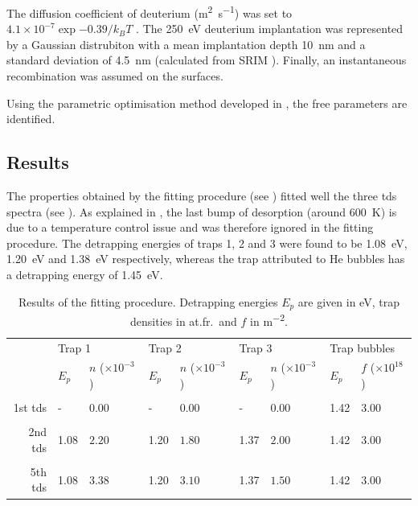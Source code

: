 The diffusion coefficient of deuterium (\si{m^2.s^{-1}}) was set to $4.1\times 10 ^{-7} \exp{-0.39/k_B T}$ .
The \SI{250}{eV} deuterium implantation was represented by a Gaussian distrubiton with a mean implantation depth \SI{10}{nm} and a standard deviation of \SI{4.5}{nm} (calculated from SRIM ).
Finally, an instantaneous recombination was assumed on the surfaces.

Using the parametric optimisation method developed in , the free parameters are identified.

\subsection{Results}

The properties obtained by the fitting procedure (see ) fitted well the three \gls{tds} spectra (see ).
As explained in \cite{ialovega_hydrogen_2020}, the last bump of desorption (around \SI{600}{K}) is due to a temperature control issue and was therefore ignored in the fitting procedure.
The detrapping energies of traps 1, 2 and 3 were found to be \SI{1.08}{eV}, \SI{1.20}{eV} and \SI{1.38}{eV} respectively, whereas the trap attributed to \gls{He} bubbles has a detrapping energy of \SI{1.45}{eV}.


\begin{table}[!h]
    \caption{Results of the fitting procedure. Detrapping energies $E_p$ are given in \si{eV}, trap densities in \si{at.fr.} and $f$ in \si{m^{-2}}.}
    \begin{tabular}{r l l l l l l l l}
    \\
    &\multicolumn{2}{l}{Trap 1}  & \multicolumn{2}{l}{Trap 2} & \multicolumn{2}{l}{Trap 3} &\multicolumn{2}{l}{Trap bubbles} \\
     & $E_p$ & $n$ ($\times 10 ^{-3}$) & $E_p$ & $n$ ($\times 10 ^{-3}$) & $E_p$ & $n$ ($\times 10 ^{-3}$) & $E_p$ & $f$ ($\times 10 ^{18}$) \\
    \\
    1st \gls{tds} & - & 0.00 & - & 0.00 & - & 0.00 & 1.42 & $3.00$ \\
    \\
    2nd \gls{tds} & 1.08 & $2.20$ & 1.20 & $1.80$ & 1.37 & $2.00$ & 1.42 & $3.00$ \\
    \\
    5th \gls{tds} & 1.08 & $3.38$ & 1.20 & $3.10$ & 1.37 & $1.50$ & 1.42 & $3.00$ \\
    \end{tabular}
\end{table}

